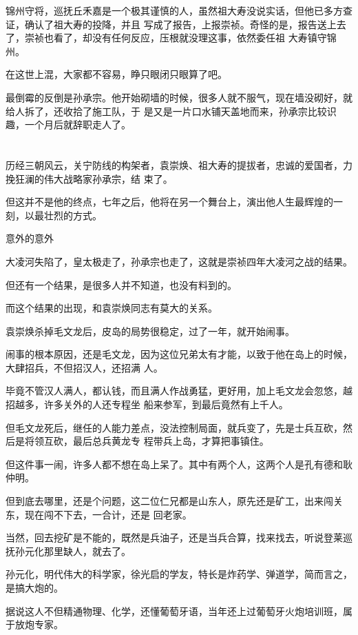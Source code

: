 \documentclass[11pt,a4paper,onecolumn]{article}
\begin{document}
锦州守将，巡抚丘禾嘉是一个极其谨慎的人，虽然祖大寿没说实话，但他已多方查证，确认了祖大寿的投降，并且
写成了报告，上报崇祯。奇怪的是，报告送上去了，崇祯也看了，却没有任何反应，压根就没理这事，依然委任祖
大寿镇守锦州。

在这世上混，大家都不容易，睁只眼闭只眼算了吧。

最倒霉的反倒是孙承宗。他开始砌墙的时候，很多人就不服气，现在墙没砌好，就给人拆了，还收拾了施工队，于
是又是一片口水铺天盖地而来，孙承宗比较识趣，一个月后就辞职走人了。

\section[\thesection]{}

历经三朝风云，关宁防线的构架者，袁崇焕、祖大寿的提拔者，忠诚的爱国者，力挽狂澜的伟大战略家孙承宗，结
束了。

但这并不是他的终点，七年之后，他将在另一个舞台上，演出他人生最辉煌的一刻，以最壮烈的方式。

意外的意外

大凌河失陷了，皇太极走了，孙承宗也走了，这就是崇祯四年大凌河之战的结果。

但还有一个结果，是很多人并不知道，也没有料到的。

而这个结果的出现，和袁崇焕同志有莫大的关系。

袁崇焕杀掉毛文龙后，皮岛的局势很稳定，过了一年，就开始闹事。

闹事的根本原因，还是毛文龙，因为这位兄弟太有才能，以致于他在岛上的时候，大肆招兵，不但招汉人，还招满
人。

毕竟不管汉人满人，都认钱，而且满人作战勇猛，更好用，加上毛文龙会忽悠，越招越多，许多关外的人还专程坐
船来参军，到最后竟然有上千人。

但毛文龙死后，继任的人能力差点，没法控制局面，就兵变了，先是士兵互砍，然后是将领互砍，最后总兵黄龙专
程带兵上岛，才算把事镇住。

但这件事一闹，许多人都不想在岛上呆了。其中有两个人，这两个人是孔有德和耿仲明。

但到底去哪里，还是个问题，这二位仁兄都是山东人，原先还是矿工，出来闯关东，现在闯不下去，一合计，还是
回老家。

当然，回去挖矿是不能的，既然是兵油子，还是当兵合算，找来找去，听说登莱巡抚孙元化那里缺人，就去了。

孙元化，明代伟大的科学家，徐光启的学友，特长是炸药学、弹道学，简而言之，是搞大炮的。

据说这人不但精通物理、化学，还懂葡萄牙语，当年还上过葡萄牙火炮培训班，属于放炮专家。
\end{document}
